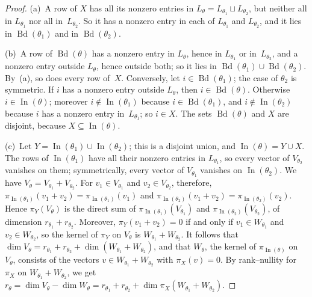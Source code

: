 \begin{proof}
(a)~A row of $X$ has all its nonzero entries in $L_\theta=L_{\theta_1}\sqcup L_{\theta_2}$, but neither all in $L_{\theta_1}$ nor all in~$L_{\theta_2}$.
So it has a nonzero entry in each of $L_{\theta_1}$ and $L_{\theta_2}$, and it lies in $\operatorname{Bd}(\theta_1)$ and in $\operatorname{Bd}(\theta_2)$.

(b)~A row of $\operatorname{Bd}(\theta)$ has a nonzero entry in $L_\theta$, hence in $L_{\theta_1}$ or in~$L_{\theta_2}$, and a nonzero entry outside $L_\theta$, hence outside both; so it lies in $\operatorname{Bd}(\theta_1)\cup\operatorname{Bd}(\theta_2)$.
By~(a), so does every row of~$X$.
Conversely, let $i\in\operatorname{Bd}(\theta_1)$; the case of $\theta_2$ is symmetric.
If $i$ has a nonzero entry outside $L_\theta$, then $i\in\operatorname{Bd}(\theta)$.
Otherwise $i\in\operatorname{In}(\theta)$; moreover $i\notin\operatorname{In}(\theta_1)$ because $i\in\operatorname{Bd}(\theta_1)$, and $i\notin\operatorname{In}(\theta_2)$ because $i$ has a nonzero entry in~$L_{\theta_1}$; so $i\in X$.
The sets $\operatorname{Bd}(\theta)$ and $X$ are disjoint, because $X\subseteq\operatorname{In}(\theta)$.

(c)~Let $Y=\operatorname{In}(\theta_1)\cup\operatorname{In}(\theta_2)$; this is a disjoint union, and $\operatorname{In}(\theta)=Y\cup X$.
The rows of $\operatorname{In}(\theta_1)$ have all their nonzero entries in $L_{\theta_1}$, so every vector of $V_{\theta_2}$ vanishes on them; symmetrically, every vector of $V_{\theta_1}$ vanishes on $\operatorname{In}(\theta_2)$.
We have $V_\theta=V_{\theta_1}+V_{\theta_2}$.
For $v_1\in V_{\theta_1}$ and $v_2\in V_{\theta_2}$, therefore, $\pi_{\operatorname{In}(\theta_1)}(v_1+v_2)=\pi_{\operatorname{In}(\theta_1)}(v_1)$ and $\pi_{\operatorname{In}(\theta_2)}(v_1+v_2)=\pi_{\operatorname{In}(\theta_2)}(v_2)$.
Hence $\pi_Y(V_\theta)$ is the direct sum of $\pi_{\operatorname{In}(\theta_1)}(V_{\theta_1})$ and $\pi_{\operatorname{In}(\theta_2)}(V_{\theta_2})$, of dimension $r_{\theta_1}+r_{\theta_2}$.
Moreover, $\pi_Y(v_1+v_2)=0$ if and only if $v_1\in W_{\theta_1}$ and $v_2\in W_{\theta_2}$, so the kernel of $\pi_Y$ on $V_\theta$ is $W_{\theta_1}+W_{\theta_2}$.
It follows that $\dim V_\theta=r_{\theta_1}+r_{\theta_2}+\dim(W_{\theta_1}+W_{\theta_2})$, and that $W_\theta$, the kernel of $\pi_{\operatorname{In}(\theta)}$ on $V_\theta$, consists of the vectors $v\in W_{\theta_1}+W_{\theta_2}$ with $\pi_X(v)=0$.
By rank--nullity for $\pi_X$ on $W_{\theta_1}+W_{\theta_2}$, we get $r_\theta=\dim V_\theta-\dim W_\theta=r_{\theta_1}+r_{\theta_2}+\dim\pi_X(W_{\theta_1}+W_{\theta_2})$.
\end{proof}

